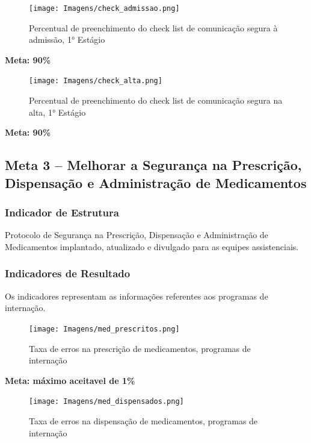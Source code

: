\documentclass[
  a4paper]{article}
\begin{document}
\begin{figure}[H]
\caption{Percentual de preenchimento do check list de comunicação segura à admissão, 1° Estágio}
\texttt{[image: Imagens/check\_admissao.png]}
\end{figure}

\begin{center}
 \textbf{Meta: 90\%}
\end{center}

\begin{figure}[H]
\caption{Percentual de preenchimento do check list de comunicação segura na alta, 1° Estágio}
\texttt{[image: Imagens/check\_alta.png]}
\end{figure}

\begin{center}
 \textbf{Meta: 90\%}
\end{center}

\subsection{Meta 3 – Melhorar a Segurança na Prescrição, Dispensação e Administração de Medicamentos}

\subsubsection{Indicador de Estrutura}

Protocolo de Segurança na Prescrição, Dispensação e Administração de
Medicamentos implantado, atualizado e divulgado para as equipes
assistenciais.

\subsubsection{Indicadores de Resultado}

Os indicadores representam as informações referentes aos programas de
internação.

\begin{figure}[H]
\caption{Taxa de erros na prescrição de medicamentos, programas de internação}
\texttt{[image: Imagens/med\_prescritos.png]}
\end{figure}

\begin{center}
 \textbf{Meta: máximo aceitavel de 1\%}
\end{center}

\begin{figure}[H]
\caption{Taxa de erros na dispensação de medicamentos, programas de internação}
\texttt{[image: Imagens/med\_dispensados.png]}
\end{figure}
\end{document}
